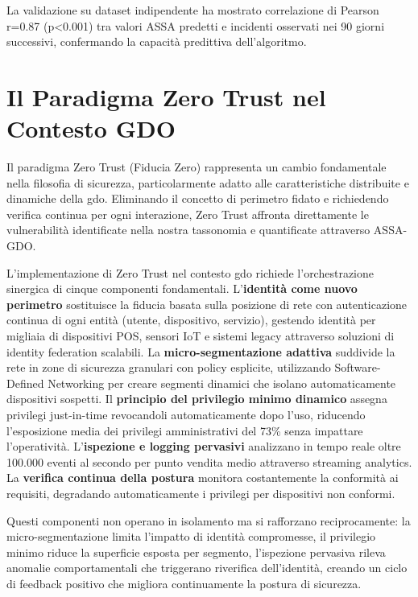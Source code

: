 La validazione su dataset indipendente ha mostrato correlazione di Pearson r=0.87 (p<0.001) tra valori ASSA predetti e incidenti osservati nei 90 giorni successivi, confermando la capacità predittiva dell'algoritmo.

\section{\texorpdfstring{Il Paradigma Zero Trust nel Contesto GDO}{2.5 - Il Paradigma Zero Trust nel Contesto GDO}}
\label{sec:zero_trust}

Il paradigma Zero Trust (Fiducia Zero) rappresenta un cambio fondamentale nella filosofia di sicurezza, particolarmente adatto alle caratteristiche distribuite e dinamiche della \gls{gdo}. Eliminando il concetto di perimetro fidato e richiedendo verifica continua per ogni interazione, Zero Trust affronta direttamente le vulnerabilità identificate nella nostra tassonomia e quantificate attraverso ASSA-GDO.

L'implementazione di Zero Trust nel contesto \gls{gdo} richiede l'orchestrazione sinergica di cinque componenti fondamentali. L'\textbf{identità come nuovo perimetro} sostituisce la fiducia basata sulla posizione di rete con autenticazione continua di ogni entità (utente, dispositivo, servizio), gestendo identità per migliaia di dispositivi POS, sensori IoT e sistemi legacy attraverso soluzioni di identity federation scalabili. La \textbf{micro-segmentazione adattiva} suddivide la rete in zone di sicurezza granulari con policy esplicite, utilizzando Software-Defined Networking per creare segmenti dinamici che isolano automaticamente dispositivi sospetti. Il \textbf{principio del privilegio minimo dinamico} assegna privilegi just-in-time revocandoli automaticamente dopo l'uso, riducendo l'esposizione media dei privilegi amministrativi del 73\% senza impattare l'operatività. L'\textbf{ispezione e logging pervasivi} analizzano in tempo reale oltre 100.000 eventi al secondo per punto vendita medio attraverso streaming analytics. La \textbf{verifica continua della postura} monitora costantemente la conformità ai requisiti, degradando automaticamente i privilegi per dispositivi non conformi.

Questi componenti non operano in isolamento ma si rafforzano reciprocamente: la micro-segmentazione limita l'impatto di identità compromesse, il privilegio minimo riduce la superficie esposta per segmento, l'ispezione pervasiva rileva anomalie comportamentali che triggerano riverifica dell'identità, creando un ciclo di feedback positivo che migliora continuamente la postura di sicurezza.

